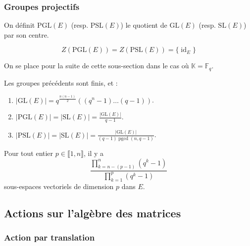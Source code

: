   \subsubsection{Groupes projectifs}


  \begin{definition}
    On définit $\mathrm{PGL}(E)$ (resp. $\mathrm{PSL}(E)$) le quotient de $\mathrm{GL}(E)$ (resp. $\mathrm{SL}(E)$) par son centre.
  \end{definition}

  \begin{proposition}
    \[ Z(\mathrm{PGL}(E)) = Z(\mathrm{PSL}(E)) = \{ \operatorname{id}_E \} \]
  \end{proposition}


  On se place pour la suite de cette sous-section dans le cas où $\mathbb{K} = \mathbb{F}_q$.

  \begin{proposition}
    Les groupes précédents sont finis, et :
    \begin{enumerate}[label=(\roman*)]
      \item $|\mathrm{GL}(E)| = q^{\frac{n(n-1)}{2}}((q^n-1) \dots (q-1))$.
      \item $|\mathrm{PGL}(E)| = |\mathrm{SL}(E)| = \frac{|\mathrm{GL}(E)|}{q-1}$.
      \item $|\mathrm{PSL}(E)| = |\mathrm{SL}(E)| = \frac{|\mathrm{GL}(E)|}{(q-1)\operatorname{pgcd}(n,q-1)}$.
    \end{enumerate}
  \end{proposition}


  \begin{application}
    Pour tout entier $p \in \llbracket 1, n \rrbracket$, il y a
    \[ \frac{\prod_{k=n-(p-1)}^{n} (q^k - 1)}{\prod_{k=1}^{p} (q^k - 1)} \]
    sous-espaces vectoriels de dimension $p$ dans $E$.
  \end{application}

  \subsection{Actions sur l'algèbre des matrices}

  \subsubsection{Action par translation}

